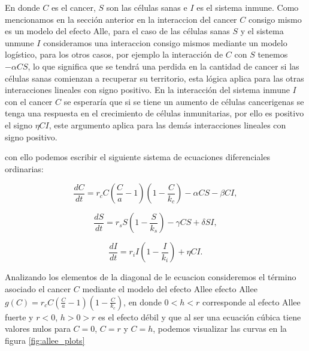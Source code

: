 \documentclass{article}
\begin{document}
En donde   $C$ es el cancer, $S$ son las células sanas e $I$ es el sistema inmune. Como mencionamos en la sección anterior en la interaccion del cancer $C$ consigo mismo es un modelo del efecto Alle, para el caso de las células sanas $S$ y el sistema unmune $I$ consideramos una interaccion consigo mismos mediante un modelo logístico, para los otros casos, por ejemplo la interacción de $C$ con $S$  tenemos $-\alpha CS$, lo que significa que se tendrá una perdida en la cantidad de cancer si las células sanas comienzan a recuperar su territorio, esta lógica aplica para las otras interacciones lineales con signo positivo. En la interacción del sistema inmune $I$ con el cancer $C$ se esperaría que si se tiene un aumento de células cancerigenas se tenga una respuesta en el crecimiento de células inmunitarias, por ello es positivo el signo $\eta C I$, este argumento aplica para las demás interacciones lineales con signo positivo.


con ello podemos escribir el siguiente sistema de ecuaciones diferenciales ordinarias:

\begin{equation}
    \frac{dC}{dt} =  r_c C (\frac{C}{a} - 1)(1-\frac{C}{k_c}) - \alpha CS - \beta CI,
    \label{eqn:cancer_dynamic}
\end{equation}

\begin{equation}
    \frac{dS}{dt} = r_s S (1 - \frac{S}{k_s})  - \gamma CS + \delta SI,
    \label{eqn:sano_dynamic}
\end{equation}


\begin{equation}
    \frac{dI}{dt} = r_i I(1-\frac{I}{k_i}) + \eta C I.
    \label{eqn:inmune_dynamic}
\end{equation}


Analizando los elementos de la diagonal de le ecuacion consideremos el término asociado el cancer $C$ mediante el modelo del efecto Allee efecto Allee $g(C) = r_c C (\frac{C}{a} - 1)(1-\frac{C}{k_c})$, en donde $0<h<r$ corresponde al efecto Allee fuerte y $r<0$,  $h>0>r$ es el efecto débil y que al ser una ecuación cúbica tiene valores nulos para $C=0$, $C=r$ y $C=h$, podemos visualizar las curvas en la figura \ref{fig:allee_plots}
\end{document}
